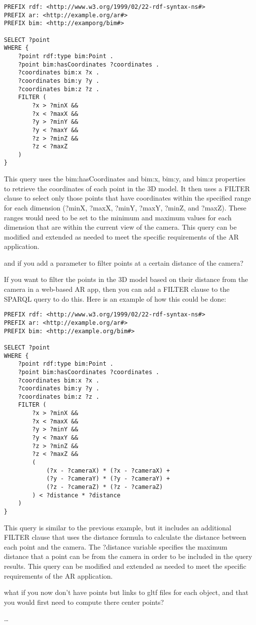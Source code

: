 \begin{description}
	\begin{lstlisting}[language=SPARQL]
PREFIX rdf: <http://www.w3.org/1999/02/22-rdf-syntax-ns#>
PREFIX ar: <http://example.org/ar#>
PREFIX bim: <http://examporg/bim#>

SELECT ?point
WHERE {
    ?point rdf:type bim:Point .
    ?point bim:hasCoordinates ?coordinates .
    ?coordinates bim:x ?x .
    ?coordinates bim:y ?y .
    ?coordinates bim:z ?z .
    FILTER (
        ?x > ?minX &&
        ?x < ?maxX &&
        ?y > ?minY &&
        ?y < ?maxY &&
        ?z > ?minZ &&
        ?z < ?maxZ
    )
}
\end{lstlisting}

	This query uses the bim:hasCoordinates and bim:x, bim:y, and bim:z properties to retrieve the coordinates of each point in the 3D model. It then uses a FILTER clause to select only those points that have coordinates within the specified range for each dimension (?minX, ?maxX, ?minY, ?maxY, ?minZ, and ?maxZ). These ranges would need to be set to the minimum and maximum values for each dimension that are within the current view of the camera. This query can be modified and extended as needed to meet the specific requirements of the AR application.

	\me and if you add a parameter to filter points at a certain distance of the camera?

	\gpt If you want to filter the points in the 3D model based on their distance from the camera in a web-based AR app, then you can add a FILTER clause to the SPARQL query to do this. Here is an example of how this could be done:

	\begin{lstlisting}[language=SPARQL]
PREFIX rdf: <http://www.w3.org/1999/02/22-rdf-syntax-ns#>
PREFIX ar: <http://example.org/ar#>
PREFIX bim: <http://example.org/bim#>

SELECT ?point
WHERE {
    ?point rdf:type bim:Point .
    ?point bim:hasCoordinates ?coordinates .
    ?coordinates bim:x ?x .
    ?coordinates bim:y ?y .
    ?coordinates bim:z ?z .
    FILTER (
        ?x > ?minX &&
        ?x < ?maxX &&
        ?y > ?minY &&
        ?y < ?maxY &&
        ?z > ?minZ &&
        ?z < ?maxZ &&
        (
            (?x - ?cameraX) * (?x - ?cameraX) +
            (?y - ?cameraY) * (?y - ?cameraY) +
            (?z - ?cameraZ) * (?z - ?cameraZ)
        ) < ?distance * ?distance
    )
}    
\end{lstlisting}

	This query is similar to the previous example, but it includes an additional FILTER clause that uses the distance formula to calculate the distance between each point and the camera. The ?distance variable specifies the maximum distance that a point can be from the camera in order to be included in the query results. This query can be modified and extended as needed to meet the specific requirements of the AR application.

	\me what if you now don't have points but links to gltf files for each object, and that you would first need to compute there center points?

	\dots
\end{description}